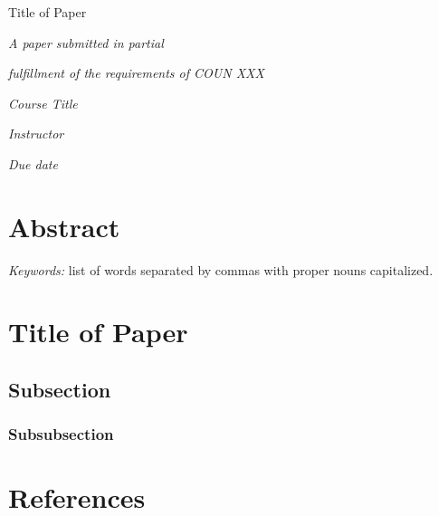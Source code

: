 \documentclass[12pt]{article}
\title{\papertitle}
\author{Author}
\newcommand{\papertitle}{Title of Paper}
\newcommand{\coursetitle}{Course Title}
\newcommand{\instructor}{Instructor}
\newcommand{\duedate}{Due date}
\renewcommand{\maketitle}{
  \begin{center}
    \vspace*{150pt}

    \begin{singlespace}
      \papertitle

      \theauthor
    \end{singlespace}

    \vspace{50pt}

    \textit{A paper submitted in partial}

    \textit{fulfillment of the requirements of COUN XXX}

    \textit{\coursetitle}

    \textit{\instructor}

    \textit{\duedate}
  \end{center}
}
\begin{document}

\maketitle

\newpage



\section{Abstract}
\setlength{\parindent}{0in}

\lipsum[6]

\setlength{\parindent}{.5in}

\textit{Keywords:} list of words separated by commas with proper nouns capitalized.

\newpage



\section{\papertitle}

\lipsum[2]

\subsection{Subsection}

\lipsum[5]

\lipsum[5]

\subsubsection{Subsubsection}

\lipsum[5]

\lipsum[5]



\newpage
\section{References}
\end{document}
